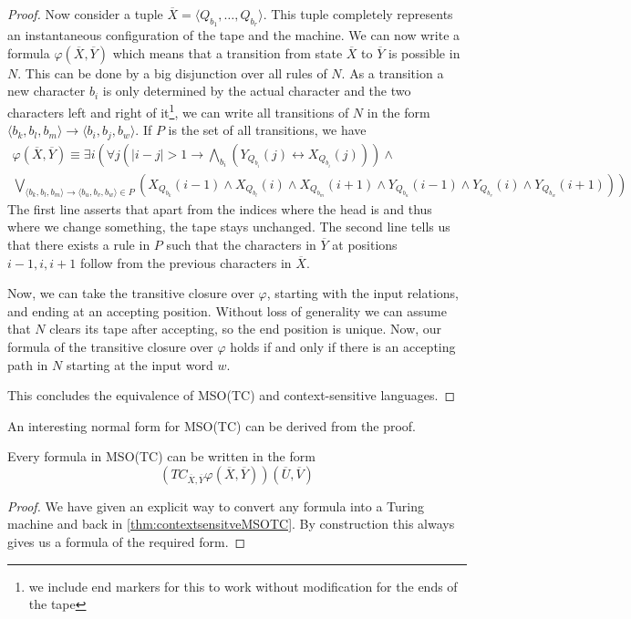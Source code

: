 \begin{proof}
    Now consider a tuple $\overline{X} = \langle Q_{b_1}, \dots, Q_{b_r} \rangle$.
    This tuple completely represents an instantaneous configuration of the tape and the machine.
    We can now write a formula $\varphi(\overline{X}, \overline{Y})$ which means that a transition from state $\overline{X}$ to $\overline{Y}$ is possible in $N$.
    This can be done by a big disjunction over all rules of $N$.
    As a transition a new character $b_i$ is only determined by the actual character and the two characters left and right of it\footnote{we include end markers for this to work without modification for the ends of the tape}, we can write all transitions of $N$ in the form $\langle b_{k},b_{l},b_{m}\rangle \to \langle b_{i}, b_{j}, b_{w} \rangle$.
    If $P$ is the set of all transitions, we have
    \begin{multline*}
        \varphi(\overline{X}, \overline{Y}) \equiv \exists i \left(\forall j \left(|i - j| > 1 \to \bigwedge_{b_i}\left(Y_{Q_{b_i}}(j) \leftrightarrow X_{Q_{b_i}}(j)\right)\right) \land \right. \\
        \left. \bigvee_{\langle b_{k},b_{l},b_{m}\rangle \to \langle b_{u}, b_{v}, b_{w} \rangle \in P} \left(X_{Q_{b_{k}}}(i - 1) \land X_{Q_{b_{l}}}(i) \land X_{Q_{b_{m}}}(i + 1) \land Y_{Q_{b_{u}}}(i - 1) \land Y_{Q_{b_{v}}}(i) \land Y_{Q_{b_{w}}}(i + 1) \right)\right)
    \end{multline*}
    The first line asserts that apart from the indices where the head is and thus where we change something, the tape stays unchanged.
    The second line tells us that there exists a rule in $P$ such that the characters in $\overline{Y}$ at positions $i - 1, i, i + 1$ follow from the previous characters in $\overline{X}$.

    Now, we can take the transitive closure over $\varphi$, starting with the input relations, and ending at an accepting position.
    Without loss of generality we can assume that $N$ clears its tape after accepting, so the end position is unique.
    Now, our formula of the transitive closure over $\varphi$ holds if and only if there is an accepting path in $N$ starting at the input word $w$.

    This concludes the equivalence of MSO(TC) and context-sensitive languages.
\end{proof}

An interesting normal form for MSO(TC) can be derived from the proof.
\begin{corollary}
    Every formula in MSO(TC) can be written in the form
    \[
        \left( TC_{\overline{X}, \overline{Y}} \varphi(\overline{X}, \overline{Y}) \right)\left( \overline{U}, \overline{V} \right)
    \]
\end{corollary}

\begin{proof}
    We have given an explicit way to convert any formula into a Turing machine and back in \cref{thm:contextsensitveMSOTC}.
    By construction this always gives us a formula of the required form.
\end{proof}

